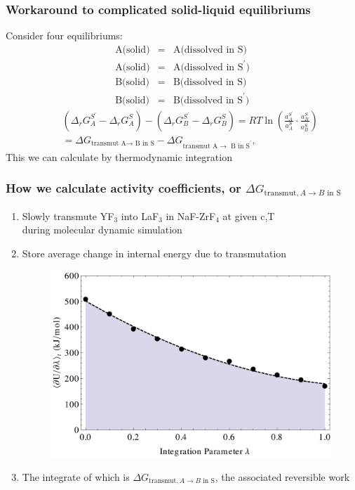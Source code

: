 \documentclass{beamer}
\begin{document}
\begin{frame}
    \frametitle{Workaround to complicated solid-liquid equilibriums}
        Consider four equilibriums:
        \begin{eqnarray}
            \text{A(solid)} &=& \text{A(dissolved in S)} \nonumber \\
            \text{A(solid)} &=& \text{A(dissolved in S}^\prime) \nonumber\\
            \text{B(solid)}  &=& \text{B(dissolved in S)} \nonumber\\
            \text{B(solid)} &=& \text{B(dissolved in S}^\prime)\nonumber
        \end{eqnarray}
    \begin{eqnarray}
        &&\left(\Delta_r G^{S^\prime}_A - \Delta_r G^S_A  \right) - \left( \Delta_r G^{S^\prime}_B - \Delta_r G^S_B  \right) = RT\ln\left( \frac{a_{A}^{S^\prime}}{a_A^S} \cdot \frac{a_B^S}{a_{B}^{S^\prime}}  \right)\nonumber \\
        &&= \Delta G_{\text{transmut A} \rightarrow\text{ B in S}} - \Delta G_{\text{transmut A} \rightarrow\text{ B in S}^\prime}, \nonumber
    \end{eqnarray}
    This we can calculate by thermodynamic integration
\end{frame}
\begin{frame}
    \frametitle{How we calculate activity coefficients, or $\Delta G_{\text{transmut},A\rightarrow B\text{ in S}}$}
    \begin{enumerate}
        \item Slowly transmute YF$_3$ into LaF$_3$ in NaF-ZrF$_4$ at given c,T\\ during molecular dynamic simulation
        \item Store average change in internal energy due to transmutation
            \begin{figure}
                \includegraphics[width=.6\textwidth]{dudl_of_l}
            \end{figure}
        \item The integrate of which is $\Delta G_{\text{transmut},A\rightarrow B\text{ in S}}$, the associated reversible work
    \end{enumerate}
\end{frame}
\end{document}
